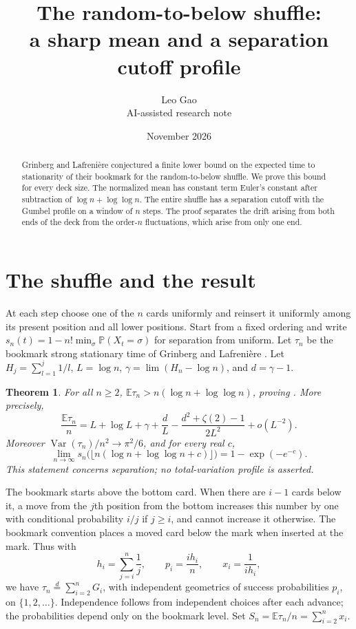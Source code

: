 \documentclass[11pt]{article}
\title{The random-to-below shuffle:\\ a sharp mean and a separation cutoff profile}
\author{Leo Gao\\\small AI-assisted research note}
\date{November 2026}
\newtheorem{theorem}{Theorem}
\newcommand{\E}{\mathbb E}
\newcommand{\Prb}{\mathbb P}
\newcommand{\Var}{\operatorname{Var}}
\begin{document}
\maketitle
\begin{abstract}
Grinberg and Lafrenière conjectured a finite lower bound on the expected time to stationarity of their bookmark for the random-to-below shuffle. We prove this bound for every deck size. The normalized mean has constant term Euler's constant after subtraction of $\log n+\log\log n$. The entire shuffle has a separation cutoff with the Gumbel profile on a window of $n$ steps. The proof separates the drift arising from both ends of the deck from the order-$n$ fluctuations, which arise from only one end.
\end{abstract}
\section{The shuffle and the result}
At each step choose one of the $n$ cards uniformly and reinsert it uniformly among its present position and all lower positions. Start from a fixed ordering and write $s_n(t)=1-n!\min_\sigma\Prb(X_t=\sigma)$ for separation from uniform. Let $\tau_n$ be the bookmark strong stationary time of Grinberg and Lafrenière \cite[\S15]{GL}. Let $H_j=\sum_{l=1}^j1/l$, $L=\log n$, $\gamma=\lim(H_n-\log n)$, and $d=\gamma-1$.
\begin{theorem}
For all $n\ge2$, $\E\tau_n> n(\log n+\log\log n)$, proving \cite[Conjecture 15.8]{GL}. More precisely,
\[
\frac{\E\tau_n}{n}
=L+\log L+\gamma+\frac dL-
 \frac{d^2+\zeta(2)-1}{2L^2}+o(L^{-2}).
\]
Moreover $\Var(\tau_n)/n^2\to\pi^2/6$, and for every real $c$,
\[
\lim_{n\to\infty}s_n\big(\lfloor n(\log n+\log\log n+c)\rfloor\big)
=1-\exp(-e^{-c}).
\]
This statement concerns separation; no total-variation profile is asserted.
\end{theorem}
The bookmark starts above the bottom card. When there are $i-1$ cards below it, a move from the $j$th position from the bottom increases this number by one with conditional probability $i/j$ if $j\ge i$, and cannot increase it otherwise. The bookmark convention places a moved card below the mark when inserted at the mark. Thus with
\[
h_i=\sum_{j=i}^n\frac1j,\qquad p_i=\frac{i h_i}{n},\qquad x_i=\frac1{i h_i},
\]
we have $\tau_n\stackrel d=\sum_{i=2}^n G_i$, with independent geometrics of success probabilities $p_i$, on $\{1,2,\ldots\}$. Independence follows from independent choices after each advance; the probabilities depend only on the bookmark level. Set $S_n=\E\tau_n/n=\sum_{i=2}^n x_i$.
\end{document}

